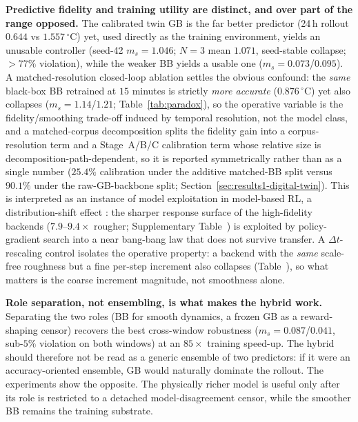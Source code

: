 \textbf{Predictive fidelity and training utility are distinct, and over part of the range opposed.} The calibrated twin GB is the far better predictor (24\,h rollout \RMSE{} $0.644$ vs $1.557\,^{\circ}$C) yet, used directly as the training environment, yields an unusable controller (seed-42 $m_s=1.046$; $N=3$ mean $1.071$, seed-stable collapse; $>77\%$ violation), while the weaker BB yields a usable one ($m_s=0.073$/$0.095$). A matched-resolution closed-loop ablation settles the obvious confound: the \emph{same} black-box BB retrained at $15$ minutes is strictly \emph{more accurate} ($0.876\,^{\circ}$C) yet also collapses ($m_s=1.14$/$1.21$; Table~\ref{tab:paradox}), so the operative variable is the fidelity/smoothing trade-off induced by temporal resolution, not the model class, and a matched-corpus decomposition splits the fidelity gain into a corpus-resolution term and a Stage~A/B/C calibration term whose relative size is decomposition-path-dependent, so it is reported symmetrically rather than as a single number ($25.4\%$ calibration under the additive matched-BB split versus $90.1\%$ under the raw-GB-backbone split; Section~\ref{sec:results1-digital-twin}). This is interpreted as an instance of model exploitation in model-based RL, a distribution-shift effect \citep{Quinonero2009DatasetShift,RiahiSamani2026OOD}: the sharper response surface of the high-fidelity backends ($7.9$--$9.4\times$ rougher; Supplementary Table~) is exploited by policy-gradient search into a near bang-bang law that does not survive transfer. A $\Delta t$-rescaling control isolates the operative property: a backend with the \emph{same} scale-free roughness but a fine per-step increment also collapses (Table~), so what matters is the coarse increment magnitude, not smoothness alone.

\textbf{Role separation, not ensembling, is what makes the hybrid work.} Separating the two roles (BB for smooth dynamics, a frozen GB as a reward-shaping censor) recovers the best cross-window robustness ($m_s=0.087$/$0.041$, sub-$5\%$ violation on both windows) at an $85\times$ training speed-up. The hybrid should therefore not be read as a generic ensemble of two predictors: if it were an accuracy-oriented ensemble, GB would naturally dominate the rollout. The experiments show the opposite. The physically richer model is useful only after its role is restricted to a detached model-disagreement censor, while the smoother BB remains the training substrate.

